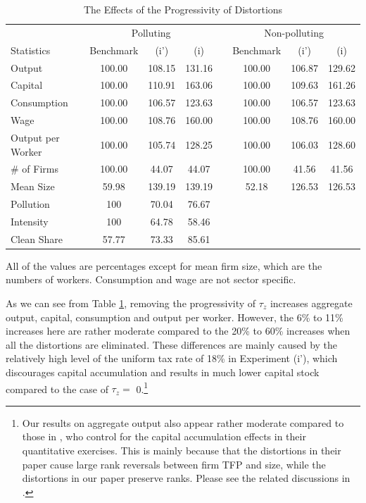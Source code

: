 \documentclass[AEJ]{AEA}
\begin{document}
\begin{table}[t]
\footnotesize
\centering
\caption{The Effects of the Progressivity of Distortions}
\begin{tabular}{lccccccc}
    \hline \hline
                         & \multicolumn{3}{c}{Polluting}    & & \multicolumn{3}{c}{Non-polluting} \\
    \cmidrule{2-4} \cmidrule{6-8}
    Statistics           & Benchmark & (i')      & (i)      & & Benchmark     & (i')    & (i) \\
    \hline
    Output               & 100.00    & 108.15   & 131.16    & & 100.00        & 106.87 & 129.62 \\
    Capital              & 100.00    & 110.91   & 163.06    & & 100.00        & 109.63 & 161.26 \\
    Consumption          & 100.00    & 106.57   & 123.63    & & 100.00        & 106.57 & 123.63 \\
    Wage                 & 100.00    & 108.76   & 160.00    & & 100.00        & 108.76 & 160.00 \\
    Output per Worker    & 100.00    & 105.74   & 128.25    & & 100.00        & 106.03 & 128.60 \\
    \hline
    \# of Firms          & 100.00    & 44.07    &44.07      & & 100.00        & 41.56  & 41.56 \\
    Mean Size            & 59.98     & 139.19   & 139.19    & & 52.18         & 126.53 & 126.53 \\
    \hline
    Pollution            & 100       & 70.04    & 76.67     \\
    Intensity            & 100       & 64.78    & 58.46     \\
    Clean Share          & 57.77     & 73.33    & 85.61     \\
    \hline
\end{tabular}
\begin{tablenotes}
     All of the values are percentages except for mean firm size, which are the numbers of workers. Consumption and wage are not sector specific.
\end{tablenotes}
\label{tab:uniform}
\end{table}

As we can see from Table \ref{tab:uniform}, removing the progressivity of $\tau_z$ increases aggregate output, capital, consumption and output per worker. However, the 6\% to 11\% increases here are rather moderate compared to the 20\% to 60\% increases when all the distortions are eliminated. These differences are mainly caused by the relatively high level of the uniform tax rate of 18\% in Experiment (i'), which discourages capital accumulation and results in much lower capital stock compared to the case of $\tau_z =$ 0.\footnote{Our results on aggregate output also appear rather moderate compared to those in \citet{RestucciaRogerson:2008}, who control for the capital accumulation effects in their quantitative exercises. This is mainly because that the distortions in their paper cause large rank reversals between firm TFP and size, while the distortions in our paper preserve ranks. Please see the related discussions in \citet{Hopenhayn:2014}.}
\end{document}
